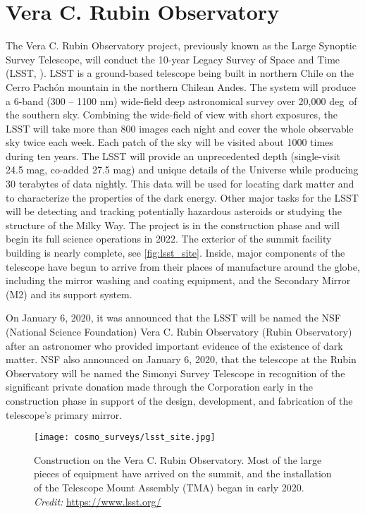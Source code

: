 \section{Vera C. Rubin Observatory}
The Vera C. Rubin Observatory project, previously known as the Large Synoptic Survey Telescope, will conduct the 10-year Legacy Survey of Space and Time (LSST, \cite{lsst}). LSST is a ground-based telescope being built in northern Chile on the Cerro Pach\'{o}n mountain in the northern Chilean Andes. The system will produce a 6-band (300 -- 1100 nm) wide-field deep astronomical survey over 20,000 deg\sq\ of the southern sky. Combining the wide-field of view with short exposures, the LSST will take more than 800 images each night and cover the whole observable sky twice each week. Each patch of the sky will be visited about 1000 times during ten years. The LSST will provide an unprecedented depth (single-visit 24.5 mag, co-added 27.5 mag) and unique details of the Universe while producing 30 terabytes of data nightly. This data will be used for locating dark matter and to characterize the properties of the dark energy. Other major tasks for the LSST will be detecting and tracking potentially hazardous asteroids or studying the structure of the Milky Way. The project is in the construction phase and will begin its full science operations in 2022. The exterior of the summit facility building is nearly complete, see \autoref{fig:lsst_site}. Inside, major components of the telescope have begun to arrive from their places of manufacture around the globe, including the mirror washing and coating equipment, and the Secondary Mirror (M2) and its support system.

On January 6, 2020, it was announced that the LSST will be named the NSF (National Science Foundation) Vera C. Rubin Observatory (Rubin Observatory) after an astronomer who provided important evidence of the existence of dark matter. NSF also announced on January 6, 2020, that the telescope at the Rubin Observatory will be named the Simonyi Survey Telescope in recognition of the significant private donation made through the Corporation early in the construction phase in support of the design, development, and fabrication of the telescope's primary mirror.
\begin{figure}[htb]
    \centering
    \texttt{[image: cosmo\_surveys/lsst\_site.jpg]}
    \caption{Construction on the Vera C. Rubin Observatory. Most of the large pieces of equipment have arrived on the summit, and the installation of the Telescope Mount Assembly (TMA) began in early 2020. \textit{Credit:} \url{https://www.lsst.org/}}
    \label{fig:lsst_site}
\end{figure}

